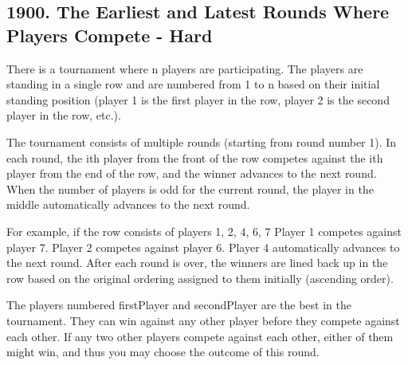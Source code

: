 \documentclass[9pt, b5paaper]{book}
\begin{document}
\subsection{1900. The Earliest and Latest Rounds Where Players Compete - Hard}
\label{sec-1-0-8}
There is a tournament where n players are participating. The players are standing in a single row and are numbered from 1 to n based on their initial standing position (player 1 is the first player in the row, player 2 is the second player in the row, etc.).

The tournament consists of multiple rounds (starting from round number 1). In each round, the ith player from the front of the row competes against the ith player from the end of the row, and the winner advances to the next round. When the number of players is odd for the current round, the player in the middle automatically advances to the next round.

For example, if the row consists of players 1, 2, 4, 6, 7
Player 1 competes against player 7.
Player 2 competes against player 6.
Player 4 automatically advances to the next round.
After each round is over, the winners are lined back up in the row based on the original ordering assigned to them initially (ascending order).

The players numbered firstPlayer and secondPlayer are the best in the tournament. They can win against any other player before they compete against each other. If any two other players compete against each other, either of them might win, and thus you may choose the outcome of this round.
\end{document}
